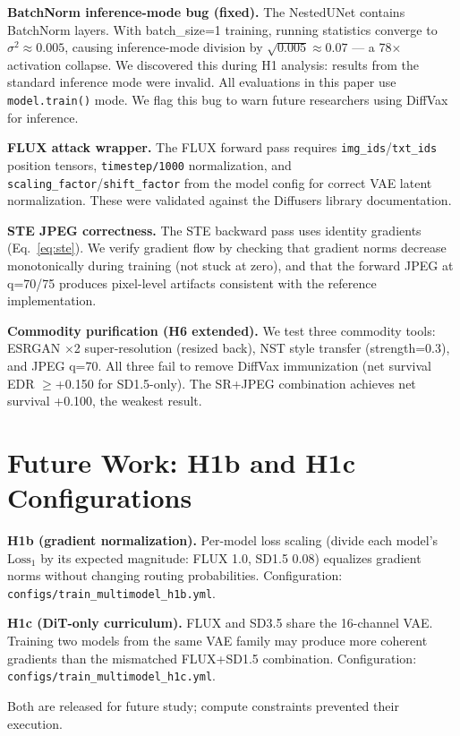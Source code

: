 \documentclass{article}
\begin{document}
\textbf{BatchNorm inference-mode bug (fixed).}
The NestedUNet contains BatchNorm layers. With batch\_size=1 training, running
statistics converge to $\sigma^2\!\approx\!0.005$, causing inference-mode division
by $\sqrt{0.005}\!\approx\!0.07$ --- a 78$\times$ activation collapse.
We discovered this during H1 analysis: results from the standard inference mode
were invalid. All evaluations in this paper use \texttt{model.train()} mode.
We flag this bug to warn future researchers using DiffVax for inference.

\textbf{FLUX attack wrapper.} The FLUX forward pass requires
\texttt{img\_ids}/\texttt{txt\_ids} position tensors, \texttt{timestep/1000}
normalization, and \texttt{scaling\_factor}/\texttt{shift\_factor} from the model
config for correct VAE latent normalization. These were validated against the
Diffusers library documentation.

\textbf{STE JPEG correctness.} The STE backward pass uses identity gradients
(Eq.~\ref{eq:ste}). We verify gradient flow by checking that gradient norms
decrease monotonically during training (not stuck at zero), and that the forward
JPEG at q=70/75 produces pixel-level artifacts consistent with the reference
implementation.

\textbf{Commodity purification (H6 extended).} We test three commodity tools:
ESRGAN $\times$2 super-resolution (resized back), NST style transfer (strength=0.3),
and JPEG q=70. All three fail to remove DiffVax immunization
(net survival EDR $\geq$+0.150 for SD1.5-only). The SR+JPEG combination achieves
net survival +0.100, the weakest result.

\section{Future Work: H1b and H1c Configurations}
\label{app:future}

\textbf{H1b (gradient normalization).} Per-model loss scaling
(divide each model's $\text{Loss}_1$ by its expected magnitude:
FLUX 1.0, SD1.5 0.08) equalizes gradient norms without changing routing probabilities.
Configuration: \texttt{configs/train\_multimodel\_h1b.yml}.

\textbf{H1c (DiT-only curriculum).} FLUX and SD3.5 share the 16-channel VAE.
Training two models from the same VAE family may produce more coherent gradients
than the mismatched FLUX+SD1.5 combination.
Configuration: \texttt{configs/train\_multimodel\_h1c.yml}.

Both are released for future study; compute constraints prevented their execution.
\end{document}
